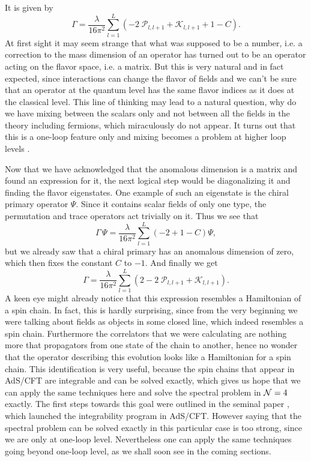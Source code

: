 It is given by
\begin{equation}
	\Gamma = \frac{\lambda}{16\pi^2}\sum_{l=1}^L \left( - 2 \; \mathcal{P}_{l,l+1} + \mathcal{K}_{l,l+1} + 1 - C\right).
\end{equation}
At first sight it may seem strange that what was supposed to be a number, i.e. a correction to the mass dimension of an operator has turned out to be an operator acting on the flavor space, i.e. a matrix. 
But this is very natural and in fact expected, since interactions can change the flavor of fields and we can't be sure that an operator at the quantum level has the same flavor indices as it does at the classical level. 
This line of thinking may lead to a natural question, why do we have mixing between the scalars only and not between all the fields in the theory including fermions, which miraculously do not appear. 
It turns out that this is a one-loop feature only and mixing becomes a problem at higher loop levels \cite{Minahan:2002ve}. 

Now that we have acknowledged that the anomalous dimension is a matrix and found an expression for it, the next logical step would be diagonalizing it and finding the flavor eigenstates. 
One example of such an eigenstate is the chiral primary operator $\Psi$. 
Since it contains scalar fields of only one type, the permutation and trace operators act trivially on it. Thus we see that
\begin{equation}
	\Gamma \, \Psi = \frac{\lambda}{16\pi^2}\sum_{l=1}^L \left( -2 + 1 - C \right) \Psi,
\end{equation}
but we already saw that a chiral primary has an anomalous dimension of zero, which then fixes the constant $C$ to $-1$. 
And finally we get
\begin{equation}
	\label{eq:so6_dimension}
	\Gamma = \frac{\lambda}{16\pi^2}\sum_{l=1}^L \left(2 - 2 \; \mathcal{P}_{l,l+1} + \mathcal{K}_{l,l+1} \right).
\end{equation}
A keen eye might already notice that this expression resembles a Hamiltonian of a spin chain. 
In fact, this is hardly surprising, since from the very beginning we were talking about fields as objects in some closed line, which indeed resembles a spin chain. 
Furthermore the correlators that we were calculating are nothing more that propagators from one state of the chain to another, hence no wonder that the operator describing this evolution looks like a Hamiltonian for a spin chain. 
This identification is very useful, because the spin chains that appear in AdS/CFT are integrable and can be solved exactly, which gives us hope that we can apply the same techniques here and solve the spectral problem in $\mathcal{N}=4$ exactly. 
The first steps towards this goal were outlined in the seminal paper \cite{Minahan:2002ve}, which launched the integrability program in AdS/CFT. 
However saying that the spectral problem can be solved exactly in this particular case is too strong, since we are only at one-loop level. 
Nevertheless one can apply the same techniques going beyond one-loop level, as we shall soon see in the coming sections. 


